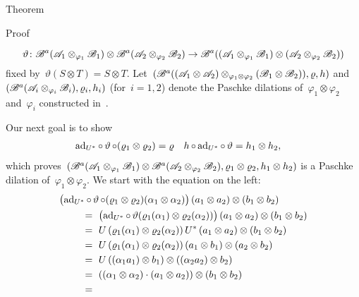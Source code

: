 \documentclass[b]{subfiles}
\begin{document}
\begin{parsec}
\begin{point}{Theorem}
\begin{point}{Proof}
\begin{point}
\begin{equation*}
    \vartheta\colon
    \mathscr{B}^a (\mathscr{A}_1 \otimes_{\varphi_1} \mathscr{B}_1) \otimes
     \mathscr{B}^a(\mathscr{A}_2 \otimes_{\varphi_2} \mathscr{B}_2) \to
    \mathscr{B}^a
     ((\mathscr{A}_1 \otimes_{\varphi_1} \mathscr{B}_1) \otimes
     (\mathscr{A}_2 \otimes_{\varphi_2} \mathscr{B}_2))
\end{equation*}
    fixed by~$\vartheta(S \otimes T) = S \otimes T$.
Let~$(\mathscr{B}^a((\mathscr{A}_1 \otimes \mathscr{A}_2) \otimes_{\varphi_1 \otimes \varphi_2} 
        (\mathscr{B}_1 \otimes \mathscr{B}_2)), \varrho, h)$
        and 
    $(\mathscr{B}^a(\mathscr{A}_i \otimes_{\varphi_i} \mathscr{B}_i), \varrho_i, h_i)$
    (for~$i=1,2$)
    denote the Paschke dilations
    of~$\varphi_1 \otimes \varphi_2$  and~$\varphi_i$
    constructed in~.
\end{point}%
\begin{point}%
    Our next goal is to show
    \begin{align}\label{tensorpaschkesecondgoal}
    \mathrm{ad}_{U^*} \mathop{\circ} \vartheta
                \mathop{\circ} (\varrho_1 \otimes \varrho_2) &= \varrho
                & h \mathop{\circ} \mathrm{ad}_{U^*} \mathop{\circ} \vartheta 
                       & = h_1 \otimes h_2,
    \end{align}
    which proves~$(
        \mathscr{B}^a(\mathscr{A}_1 \otimes_{\varphi_1} \mathscr{B}_1)
        \otimes \mathscr{B}^a(\mathscr{A}_2 \otimes_{\varphi_2} \mathscr{B}_2),
        \varrho_1 \otimes \varrho_2,
        h_1 \otimes h_2)$
    is a Paschke dilation of~$\varphi_1 \otimes \varphi_2$.
    We start with the equation on the left:
\begin{align*}
    &\bigl(\ad_{U^*} \after \vartheta \after  (\varrho_1 \otimes \varrho_2) (\alpha_1 \otimes \alpha_2)\bigr)
    \, (a_1 \otimes a_2) \otimes (b_1 \otimes b_2) \\
    &\qquad \ = \ 
    \bigl(\ad_{U^*} \after \vartheta (\varrho_1 (\alpha_1)\otimes \varrho_2(\alpha_2)) \bigr)
    \, (a_1 \otimes a_2) \otimes (b_1 \otimes b_2) \\
    &\qquad \ = \ 
    U \,(\varrho_1 (\alpha_1)\otimes \varrho_2(\alpha_2)) \, U^*
    \, (a_1 \otimes a_2) \otimes (b_1 \otimes b_2) \\
    &\qquad \ = \ 
    U \,(\varrho_1 (\alpha_1)\otimes \varrho_2(\alpha_2)) 
    \, (a_1 \otimes b_1) \otimes (a_2 \otimes b_2) \\
    &\qquad \ = \ 
    U \,  ((\alpha_1 a_1) \otimes b_1) \otimes ((\alpha_2 a_2) \otimes b_2) \\
    &\qquad \ = \ 
     ((\alpha_1 \otimes \alpha_2)\cdot (a_1 \otimes a_2)) \otimes (b_1 \otimes b_2) \\
    &\qquad \ = \ 

\end{align*}
\end{point}
\end{point}
\end{point}
\end{parsec}
\end{document}
